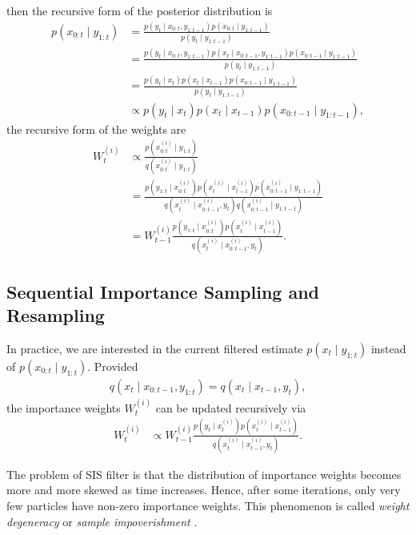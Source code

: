 then the recursive form of the posterior distribution is 
\begin{align*}
p(x_{0:t}\mid y_{1:t}) &= \frac{p(y_t \mid x_{0:t},y_{1:t-1})p(x_{0:t}\mid y_{1:t-1})}{p(y_t \mid y_{1:t-1})}\\
&= \frac{p(y_t \mid x_{0:t},y_{1:t-1}) p(x_t \mid x_{0:t-1},y_{1:t-1}) p(x_{0:t-1}\mid y_{1:t-1} ) }{p(y_t \mid y_{1:t-1})}\\
&= \frac{p(y_t \mid x_t ) p(x_t \mid x_{t-1}) p(x_{0:t-1}\mid y_{1:t-1} ) }{p(y_t \mid y_{1:t-1})}\\
&\propto p(y_t \mid x_t ) p(x_t \mid x_{t-1}) p(x_{0:t-1}\mid y_{1:t-1} ),
\end{align*}
the recursive form of the weights are
\begin{align*}
W_t ^{(i)} &\propto \frac{p(x_{0:t}^{(i)}\mid y_{1:t})}{q(x_{0:t}^{(i)}\mid y_{1:t})}\\
&= \frac{ p(y_{1:t}\mid x_{0:t}^{(i)}) p(x_{t}^{(i)}\mid x_{t-1}^{(i)})  p(x_{0:t-1}^{(i)}\mid y_{1:t-1})}   { q(x_{t}^{(i)}\mid x_{0:t-1}^{(i)},y_{t})  q(x_{0:t-1}^{(i)}\mid y_{1:t-1}) } \\
&= W_{t-1}^{(i)} \frac{ p(y_{1:t}\mid x_{0:t}^{(i)}) p(x_{t}^{(i)}\mid x_{t-1}^{(i)}) }   {q(x_{t}^{(i)}\mid x_{0:t-1}^{(i)},y_{t})}.
\end{align*}

\subsection{Sequential Importance Sampling and Resampling}
 
In practice, we are interested in the current filtered estimate $p(x_t \mid y_{1:t})$ instead of $p(x_{0:t}\mid y_{1:t})$. Provided 
\begin{align*}
q(x_t \mid  x_{0:t-1},y_{1:t})=q(x_t \mid  x_{t-1},y_t ),
\end{align*}
the importance weights $W_t ^{(i)}$ can be updated recursively via 
\begin{align*}
W_t ^{(i)} &\propto W_{t-1}^{(i)} \frac{ p(y_t \mid x_t ^{(i)}) p(x_{t}^{(i)}\mid x_{t-1}^{(i)}) }   {q(x_{t}^{(i)}\mid x_{t-1}^{(i)},y_{t})}.
\end{align*}

The problem of SIS filter is that the distribution of importance weights becomes more and more skewed as time increases. Hence, after some iterations, only very few particles have non-zero importance weights. This phenomenon is called \textit{weight degeneracy} or \textit{sample impoverishment} \cite{smcmip2011}.

